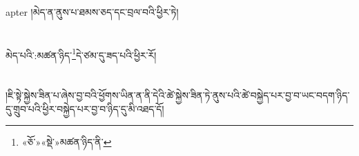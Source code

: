 apter{ }།མེད་ན་ནུས་པ་ཐམས་ཅད་དང་བྲལ་བའི་ཕྱིར་ཏེ།\chapter{ }མེད་པའི་:མཚན་ཉིད་\footnote{«ཅོ་»«སྡེ་»མཚན་ཉིད་ནི་}དེ་ཙམ་དུ་ཟད་པའི་ཕྱིར་རོ།\chapter{ }།ཇི་སྟེ་སྐྱེས་ཟིན་པ་ཞེས་བྱ་བའི་ཕྱོགས་ཡིན་ན་ནི་དེའི་ཚེ་སྐྱེས་ཟིན་ཏེ་ནུས་པའི་ཚེ་བསྐྱེད་པར་བྱ་བ་ཡང་བདག་ཉིད་དུ་གྲུབ་པའི་ཕྱིར་བསྐྱེད་པར་བྱ་བ་ཉིད་དུ་མི་འཐད་དོ།
